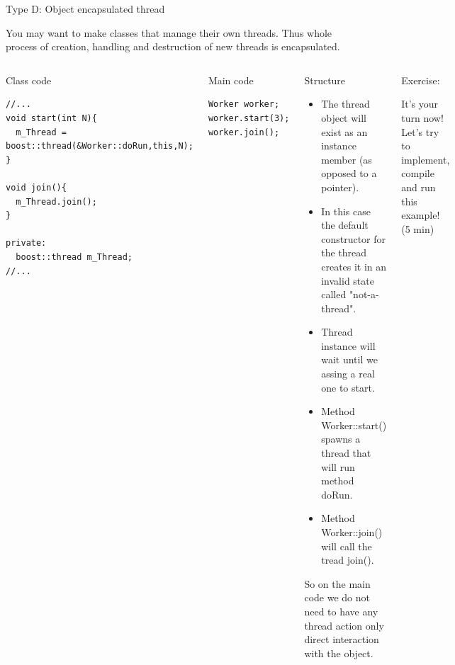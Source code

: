 \documentclass[8pt]{beamer}
\begin{document}
\begin{frame}[fragile]{Type D: Object encapsulated thread}

You may want to make classes that manage their own threads. Thus whole process of creation, handling and destruction of new threads is encapsulated.

\begin{columns}
  
\begin{exampleblock}{Class code}

\begin{lstlisting}
//...
void start(int N){
  m_Thread = boost::thread(&Worker::doRun,this,N);
}

void join(){
  m_Thread.join();
}

private:
  boost::thread m_Thread;
//...
\end{lstlisting}

\end{exampleblock}
 
\begin{exampleblock}{Main code}

\begin{lstlisting} 
Worker worker;
worker.start(3);
worker.join();
\end{lstlisting}

\end{exampleblock}
 

\begin{block}{Structure}
\footnotesize

\begin{itemize}
  \item The thread object will exist as an instance member (as opposed to a pointer).
  \item In this case the default constructor for the thread creates it in an invalid state called "not-a-thread".
  \item Thread instance will wait until we assing a real one to start.
\end{itemize}

\begin{itemize}
  \item Method Worker::start() spawns a thread that will run method doRun.
  \item Method Worker::join() will call the tread join().
\end{itemize}

So on the main code we do not need to have any thread action only direct interaction with the object.

\end{block}

\begin{block}{Exercise:}
\footnotesize

It's your turn now! Let's try to implement, compile and run this example! (5 min)
 
\end{block} 
 
\end{columns}

\end{frame}
\end{document}
